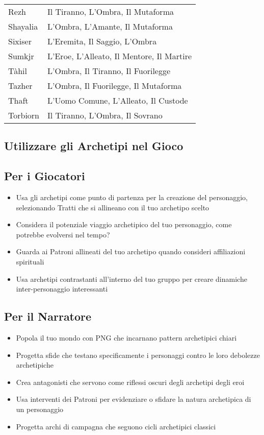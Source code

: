 \begin{multicols}{2}
\begin{tabularx}{\columnwidth}{lX}
\rowcolor{gray!20}Rezh & Il Tiranno, L'Ombra, Il Mutaforma \\
Shayalia & L'Ombra, L'Amante, Il Mutaforma \\
\rowcolor{gray!20}Sixiser & L'Eremita, Il Saggio, L'Ombra \\
Sumkjr & L'Eroe, L'Alleato, Il Mentore, Il Martire \\
\rowcolor{gray!20}Tàhil & L'Ombra, Il Tiranno, Il Fuorilegge \\
Tazher & L'Ombra, Il Fuorilegge, Il Mutaforma \\
\rowcolor{gray!20}Thaft & L'Uomo Comune, L'Alleato, Il Custode \\
Torbiorn & Il Tiranno, L'Ombra, Il Sovrano \\

\end{tabularx}

\subsection*{Utilizzare gli Archetipi nel Gioco}

\subsection*{Per i Giocatori}
\noindent\begin{itemize}[leftmargin=*] \setlength{\itemsep}{0pt}
\item Usa gli archetipi come punto di partenza per la creazione del personaggio, selezionando Tratti che si allineano con il tuo archetipo scelto
\item Considera il potenziale viaggio archetipico del tuo personaggio, come potrebbe evolversi nel tempo?
\item Guarda ai Patroni allineati del tuo archetipo quando consideri affiliazioni spirituali
\item Usa archetipi contrastanti all'interno del tuo gruppo per creare dinamiche inter-personaggio interessanti
\end{itemize}

\subsection*{Per il Narratore}
\noindent\begin{itemize}[leftmargin=*] \setlength{\itemsep}{0pt}
\item Popola il tuo mondo con PNG che incarnano pattern archetipici chiari
\item Progetta sfide che testano specificamente i personaggi contro le loro debolezze archetipiche
\item Crea antagonisti che servono come riflessi oscuri degli archetipi degli eroi
\item Usa interventi dei Patroni per evidenziare o sfidare la natura archetipica di un personaggio
\item Progetta archi di campagna che seguono cicli archetipici classici
\end{itemize}


\end{multicols}
